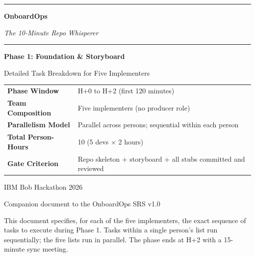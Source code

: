 \documentclass[11pt,letterpaper]{article}
\begin{document}

\begin{titlepage}
\thispagestyle{empty}
\centering
\vspace*{1.5cm}

{\color{ibmblue}\rule{\textwidth}{2pt}}
\vspace{0.8cm}

{\fontsize{38}{46}\selectfont\bfseries\color{ibmblue} OnboardOps\par}
\vspace{0.3cm}
{\Large\itshape\color{ibmgray} The 10-Minute Repo Whisperer\par}
\vspace{0.4cm}

{\color{ibmblue}\rule{\textwidth}{2pt}}
\vspace{2.0cm}

{\huge\bfseries Phase 1: Foundation \& Storyboard\par}
\vspace{0.3cm}
{\large Detailed Task Breakdown for Five Implementers\par}
\vspace{2.5cm}

\begin{tabularx}{0.75\textwidth}{lX}
\toprule
\textbf{Phase Window} & H+0 to H+2 (first 120 minutes) \\
\textbf{Team Composition} & Five implementers (no producer role) \\
\textbf{Parallelism Model} & Parallel across persons; sequential within each person \\
\textbf{Total Person-Hours} & 10 (5 devs $\times$ 2 hours) \\
\textbf{Gate Criterion} & Repo skeleton + storyboard + all stubs committed and reviewed \\
\bottomrule
\end{tabularx}

\vfill

{\large IBM Bob Hackathon 2026\par}
{\normalsize Companion document to the OnboardOps SRS v1.0\par}
\vspace{0.6cm}
{\small\color{ibmgray} This document specifies, for each of the five implementers, the exact sequence of tasks to execute during Phase 1. Tasks within a single person's list run sequentially; the five lists run in parallel. The phase ends at H+2 with a 15-minute sync meeting.\par}
\end{titlepage}
\end{document}
